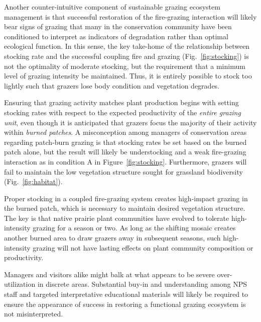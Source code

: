 Another counter-intuitive component of sustainable grazing ecosystem management is that successful restoration of the fire-grazing interaction will likely bear signs of grazing that many in the conservation community have been conditioned to interpret as indicators of degradation rather than optimal ecological function. 
In this sense, the key take-home of the relationship between stocking rate and the successful coupling fire and grazing (Fig.~\ref{fig:stocking}) is not the optimality of moderate stocking, but the requirement that a minimum level of grazing intensity be maintained.
Thus, it is entirely possible to stock too lightly such that grazers lose body condition and vegetation degrades.

Ensuring that grazing activity matches plant production begins with setting stocking rates with respect to the expected productivity of the \emph{entire grazing unit}, even though it is anticipated that grazers focus the majority of their activity within \emph{burned patches}. 
A misconception among managers of conservation areas regarding patch-burn grazing is that stocking rates be set based on the burned patch alone, but the result will likely be understocking and a weak fire-grazing interaction as in condition A in Figure~\ref{fig:stocking}. 
Furthermore, grazers will fail to maintain the low vegetation structure sought for grassland biodiversity (Fig.~\ref{fig:habitat}).

Proper stocking in a coupled fire-grazing system creates high-impact grazing in the burned patch, which is necessary to maintain desired vegetation structure.
The key is that native prairie plant communities have evolved to tolerate high-intensity grazing for a season or two. 
As long as the shifting mosaic creates another burned area to draw grazers away in subsequent seasons, such high-intensity grazing will not have lasting effects on plant community composition or productivity. 

Managers and visitors alike might balk at what appears to be severe over-utilization in discrete areas. 
Substantial buy-in and understanding among NPS staff and targeted interpretative educational materials will likely be required to ensure the appearance of success in restoring a functional grazing ecosystem is not misinterpreted. 